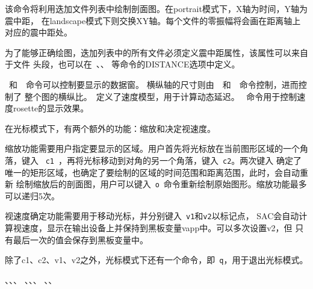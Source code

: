 该命令将利用迭加文件列表中绘制剖面图。在portrait模式下，X轴为时间，Y轴为震中距，
在landscape模式下则交换XY轴。每个文件的零振幅将会画在距离轴上对应的震中距处。

为了能够正确绘图，迭加列表中的所有文件必须定义震中距属性，该属性可以来自于文件
头段，也可以在~、、
等命令的DISTANCE选项中定义。

~和~~命令可以控制要显示的数据窗。
横纵轴的尺寸则由~~和~~命令控制，进而控制了
整个图的横纵比。~定义了速度模型，用于计算动态延迟。
~命令用于控制速度rosette的显示效果。

在光标模式下，有两个额外的功能：缩放和决定视速度。

缩放功能需要用户指定要显示的区域。用户首先将光标放在当前图形区域的一个角落，键入
~\verb+c1+~，再将光标移动到对角的另一个角落，键入~\verb+c2+。两次键入
确定了唯一的矩形区域，也确定了要绘制的区域的时间范围和距离范围，此时，会自动重新
绘制缩放后的剖面图，用户可以键入~\verb+o+~命令重新绘制原始图形。缩放功能最多
可以递归5次。

视速度确定功能需要用于移动光标，并分别键入~\verb+v1+和\verb+v2+以标记点，
SAC会自动计算视速度，显示在输出设备上并保持到黑板变量vapp中。可以多次设置v2，但
只有最后一次的值会保存到黑板变量中。

除了c1、c2、v1、v2之外，光标模式下还有一个命令，即~\verb+q+，用于退出光标模式。

、、、
、、、
、、
